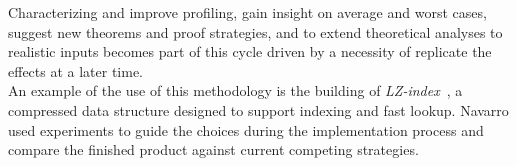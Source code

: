 Characterizing and improve profiling, gain insight on average and worst cases, suggest new theorems and proof strategies, and to extend theoretical analyses to realistic inputs becomes part of this cycle driven by a necessity of replicate the effects at a later time.\\

An example of the use of this methodology is the building of \textit{LZ-index}~\cite{Navarro_2009}, a compressed data structure designed to support indexing and fast lookup. Navarro used experiments to guide the choices during the implementation process and compare the finished product against current competing strategies.\\
